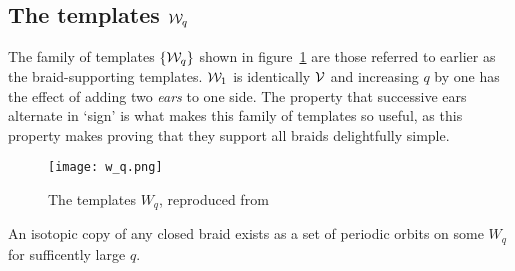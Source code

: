 \documentclass[paper.tex]{subfiles}
\begin{document}
\subsection{The templates $\mathcal{W}_q$}

The family of templates $\{ \mathcal{W}_q \}$ shown in figure~\ref{fig:w_q} are those referred to earlier as the braid-supporting templates. $\mathcal{W}_1$ is identically $\mathcal{V}$ and increasing $q$ by one has the effect of adding
two \emph{ears} to one side. The property that successive ears alternate in `sign' is what makes this family of templates so useful, as this property makes proving that they support all braids delightfully simple.

\begin{figure}[h]
  \centering
  \texttt{[image: w\_q.png]}
  \caption{The templates $W_q$, reproduced from~\cite{knottyode}}\label{fig:w_q}
\end{figure}


\begin{lemma}[Ghrist 1996]
  An isotopic copy of any closed braid exists as a set of periodic orbits on some $W_q$ for sufficently large $q$.
\end{lemma}
\end{document}

